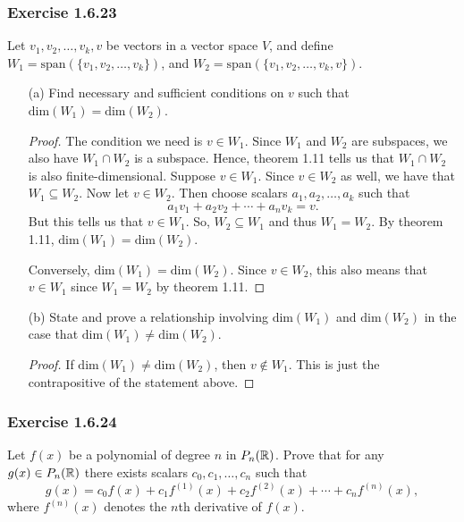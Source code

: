 \subsubsection{Exercise 1.6.23} Let \( v_{1}, v_{2}, \dots, v_{k }, v  \) be vectors in a vector space \( V  \), and define \( W_{1} = \text{span}(\{ v_{1}, v_{2}, \dots, v_{k } \} )  \), and \( W_{2} = \text{span}(\{ v_{1}, v_{2}, \dots, v_{k }, v  \} ) \).
\begin{enumerate}
    \item[(a)] Find necessary and sufficient conditions on \( v  \) such that \( \text{dim}(W_{1}) = \text{dim}(W_{2}) \).
        \begin{proof}
            The condition we need is \( v \in W_{1} \). Since \( W_{1} \) and \( W_{2} \) are subspaces, we also have \( W_{1} \cap W_{2} \) is a subspace. Hence, theorem 1.11 tells us that \( W_{1} \cap W_{2} \) is also finite-dimensional. Suppose \( v \in W_{1} \). Since \( v \in W_{2} \) as well, we have that \( W_{1} \subseteq W_{2} \). Now let \( v \in W_{2} \). Then choose scalars \( a_{1}, a_{2} , \dots , a_{k} \) such that 
            \[ a_{1} v_{1} + a_{2} v_{2} + \cdots + a_{n} v_{k } = v.  \]
            But this tells us that \( v \in W_{1} \). So, \( W_{2} \subseteq W_{1} \) and thus \( W_{1} = W_{2} \). By theorem 1.11, \( \text{dim}(W_{1}) = \text{dim}(W_{2})  \).

            Conversely, \( \text{dim}(W_{1}) = \text{dim}(W_{2}) \). Since \( v \in W_{2}  \), this also means that \( v \in W_{1} \) since \( W_{1} = W_{2} \) by theorem 1.11.  
        \end{proof}
    \item[(b)] State and prove a relationship involving \( \text{dim}(W_{1}) \) and \( \text{dim}(W_{2}) \) in the case that \( \text{dim}(W_{1}) \neq \text{dim}(W_{2})  \).
        \begin{proof}
        If \( \text{dim}(W_{1}) \neq \text{dim}(W_{2}) \), then \( v \notin W_{1} \). This is just the contrapositive of the statement above.
        \end{proof}
\end{enumerate}


\subsubsection{Exercise 1.6.24} Let \( f(x) \) be a polynomial of degree \( n \) in \( P_{n}(\mathbb{R}) \). Prove that for any \( g(x) \in P_{n}(\mathbb{R})  \) there exists scalars \( c_{0}, c_{1}, \dots, c_{n}  \) such that  
\[  g(x) = c_{0} f(x) + c_{1} f^{(1)}(x) + c_{2} f^{(2)}(x) + \cdots + c_{n} f^{(n)}(x), \]
where \( f^{(n)}(x) \) denotes the \( n \)th derivative of \( f(x)  \).

